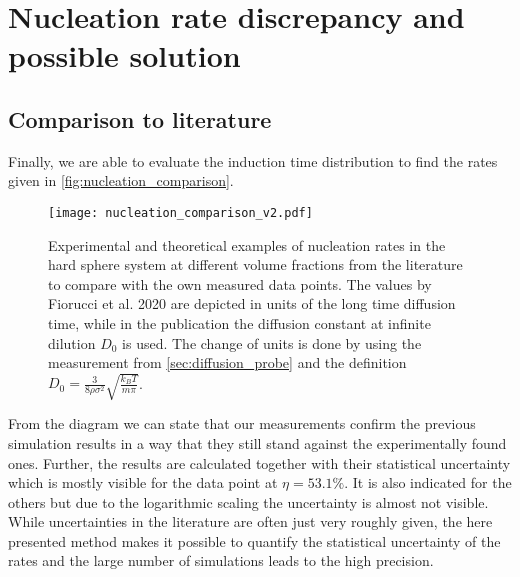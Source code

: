 \section{Nucleation rate discrepancy and possible solution}
\subsection{Comparison to literature}
\label{sec:nucleation_rates}
Finally, we are able to evaluate the induction time distribution to find the rates given in \autoref{fig:nucleation_comparison}.

\begin{figure}[h]
\centering
\texttt{[image: nucleation\_comparison\_v2.pdf]}
\caption[Nucleation rate comparison with literature values]{Experimental and theoretical examples of nucleation rates in the hard sphere system at different volume fractions from the literature\cite{Harland1997,He1996,schaetzel1993,Sinn2001,Auer2001,Filion2010a,Fiorucci2020a,Schilling2011} to compare with the own measured data points. The values by Fiorucci et al. 2020 are depicted in units of the long time diffusion time, while in the publication the diffusion constant at infinite dilution $D_0$ is used. The change of units is done by using the measurement from \autoref{sec:diffusion_probe} and the definition $D_0 = \frac{3}{8\rho \sigma^2} \sqrt{ \frac{k_B T}{m \pi}}$.}
\label{fig:nucleation_comparison}
\end{figure}

From the diagram we can state that our measurements confirm the previous simulation results in a way that they still stand against the experimentally found ones. Further, the results are calculated together with their statistical uncertainty which is mostly visible for the data point at $\eta = 53.1 \%$. It is also indicated for the others but due to the logarithmic scaling the uncertainty is almost not visible.\\
While uncertainties in the literature are often just very roughly given, the here presented method makes
it possible to quantify the statistical uncertainty of the rates and the large number of simulations leads to the high precision.\\


